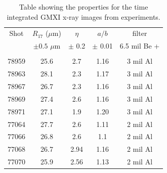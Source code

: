 \documentclass[aip,reprint]{revtex4-1}
\begin{document}
%
%
%
%
%
%
\begin{table}
\caption{\label{tab:Exp_3} Table showing the properties for the time integrated GMXI x-ray images from experiments.}
\begin{ruledtabular}

\begin{tabular}{c c c c c}

Shot & $R_{17}$ ($\mu$m) & $\eta$ & $a/b$ & filter  \\


 & $\pm 0.5$ $\mu$m & $\pm$ 0.2 & $\pm$ 0.01  & 6.5 mil Be +\\ 

\hline

\\
78959 &   25.6  & 2.7  & 1.16 &  3 mil Al  \\   %

78963 &  28.1 & 2.3 & 1.17  & 3 mil Al \\  %

78967 & 26.7  & 2.3  & 1.16 & 3 mil Al \\ %

78969 & 27.4  & 2.6   & 1.16  &  3 mil Al \\ %

78971 & 27.1  & 1.9 &  1.20 & 3 mil Al \\ %

77064  & 27.7  & 2.6   & 1.11 &   2 mil Al \\ %

77066  & 26.8  & 2.6  & 1.1 & 2 mil Al \\ %

77068  & 26.7 &  2.94  & 1.16  &  2 mil Al \\ %

77070  & 25.9  & 2.56  &	1.13   & 2 mil Al \\ 

\end{tabular}
\end{ruledtabular}
\end{table}
%
%
%
%
%
%
%
\end{document}
